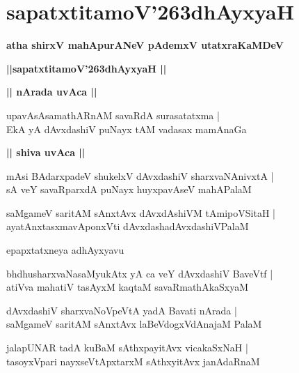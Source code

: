 \documentclass[twoside,12pt,openright]{book}
\def\S{\char'263}
\newcounter{shloka}[chapter]
\def\uvaca#1{\centerline{{\large\textbf{#1}}}}
\begin{document}
\chapter{sapatxtitamoV\S dhAyxyaH}

\begin{center}
{\LARGE\bfseries atha shirxV mahApurANeV pAdemxV utatxraKaMDeV}
\end{center}

\begin{center}
{\LARGE\bfseries ||sapatxtitamoV\S dhAyxyaH || }
\end{center}

\uvaca{|| nArada uvAca ||}

\begin{shloka}%
upavAsAsamathARnAM savaRdA surasatatxma |\\
EkA yA dAvxdashiV puNayx tAM vadasax mamAnaGa
\end{shloka}

\uvaca{|| shiva uvAca ||}

\begin{shloka}%
mAsi BAdarxpadeV shukelxV dAvxdashiV sharxvaNAnivxtA |\\
sA veY savaRparxdA puNayx huyxpavAseV mahAPalaM 
\end{shloka}

\begin{shloka}%
saMgameV saritAM sAnxtAvx dAvxdAshiVM tAmipoVSitaH |\\
ayatAnxtasxmavAponxVti dAvxdashadAvxdashiVPalaM
\end{shloka}

\begin{center}
epapxtatxneya adhAyxyavu
\end{center}

\begin{shloka}%
bhdhusharxvaNasaMyukAtx yA ca veY dAvxdashiV BaveVtf |\\
atiVva mahatiV tasAyxM kaqtaM savaRmathAkaSxyaM 
\end{shloka}

\begin{shloka}%
dAvxdashiV sharxvaNoVpeVtA yadA Bavati nArada |\\
saMgameV saritAM sAnxtAvx laBeVdogxVdAnajaM PalaM 
\end{shloka}

\begin{shloka}%
jalapUNAR tadA kuBaM sAthxpayitAvx vicakaSxNaH |\\
tasoyxVpari nayxseVtApxtarxM sAthxyitAvx janAdaRnaM 
\end{shloka}
\end{document}
